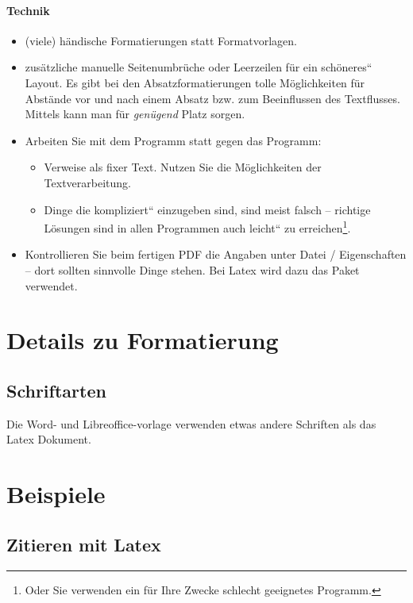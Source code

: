 \paragraph{Technik}
\begin{itemize}
\item (viele) händische Formatierungen statt Formatvorlagen.
\item zusätzliche manuelle Seitenumbrüche oder Leerzeilen für ein \quotedblbase schöneres``
Layout. Es gibt bei den Absatzformatierungen tolle Möglichkeiten für
Abstände vor und nach einem Absatz bzw. zum Beeinflussen des Textflusses.
Mittels \zB {} kann man für
\textit{genügend} Platz sorgen.
\item Arbeiten Sie mit dem Programm statt gegen das Programm:

\begin{itemize}
\item Verweise als fixer Text. Nutzen Sie die Möglichkeiten der Textverarbeitung.
\item Dinge die \quotedblbase kompliziert`` einzugeben sind, sind meist
falsch -- richtige Lösungen sind in allen Programmen auch \quotedblbase leicht``
zu erreichen\footnote{Oder Sie verwenden ein für Ihre Zwecke schlecht geeignetes Programm.}.
\end{itemize}
\item Kontrollieren Sie beim fertigen PDF die Angaben unter Datei / Eigenschaften
-- dort sollten sinnvolle Dinge stehen. Bei Latex wird dazu das Paket
\texttt{} verwendet.
\end{itemize}

\section{Details zu Formatierung}


\subsection{Schriftarten}

Die Word- und Libreoffice-vorlage verwenden etwas andere Schriften
als das Latex Dokument.


\section{Beispiele}


\subsection{Zitieren mit Latex}

